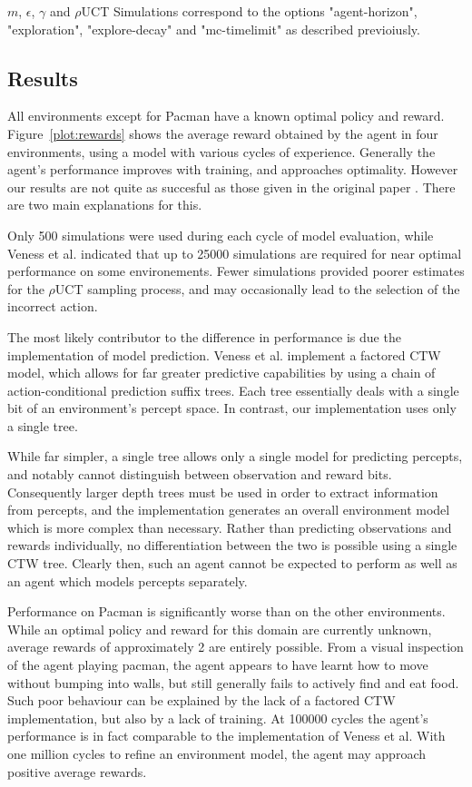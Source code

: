 \documentclass[paper=a4, fontsize=11pt]{scrartcl} %
\numberwithin{equation}{section} %
\numberwithin{figure}{section} %
\numberwithin{table}{section} %
\begin{document}
\noindent $m$, $\epsilon$, $\gamma$ and $\rho$UCT Simulations correspond to the options "agent-horizon", "exploration", "explore-decay" and "mc-timelimit" as described previoiusly.

\subsection{Results}

All environments except for Pacman have a known optimal policy and reward. Figure~\ref{plot:rewards} shows the average reward obtained by the agent in four environments, using a model with various cycles of experience. Generally the agent's performance improves with training, and approaches optimality. However our results are not quite as succesful as those given in the original paper \cite{VNHS09}. There are two main explanations for this.

Only 500 simulations were used during each cycle of model evaluation, while Veness et al. indicated that up to 25000 simulations are required for near optimal performance on some environements. Fewer simulations provided poorer estimates for the $\rho$UCT sampling process, and may occasionally lead to the selection of the incorrect action.

The most likely contributor to the difference in performance is due the implementation of model prediction. Veness et al. implement a factored CTW model, which allows for far greater predictive capabilities by using a chain of action-conditional prediction suffix trees. Each tree essentially deals with a single bit of an environment's percept space. In contrast, our implementation uses only a single tree.

While far simpler, a single tree allows only a single model for predicting percepts, and notably cannot distinguish between observation and reward bits. Consequently larger depth trees must be used in order to extract information from percepts, and the implementation generates an overall environment model which is more complex than necessary. Rather than predicting observations and rewards individually, no differentiation between the two is possible using a single CTW tree. Clearly then, such an agent cannot be expected to perform as well as an agent which models percepts separately.

Performance on Pacman is significantly worse than on the other environments. While an optimal policy and reward for this domain are currently unknown, average rewards of approximately 2 are entirely possible. From a visual inspection of the agent playing pacman, the agent appears to have learnt how to move without bumping into walls, but still generally fails to actively find and eat food. Such poor behaviour can be explained by the lack of a factored CTW implementation, but also by a lack of training. At 100000 cycles the agent's performance is in fact comparable to the implementation of Veness et al. With one million cycles to refine an environment model, the agent may approach positive average rewards.
\end{document}
